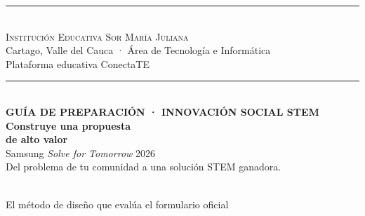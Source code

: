 \documentclass[11pt, letterpaper]{article}
\begin{document}
\begin{titlepage}
\thispagestyle{empty}
\begin{center}
  {\color{smjAzul}\rule{\linewidth}{2pt}}\\[0.25cm]
  {\large\sffamily\textsc{\color{smjAzul} Institución Educativa Sor María Juliana}}\\[0.1cm]
  {\normalsize\sffamily\color{smjVino} Cartago, Valle del Cauca \;·\; Área de Tecnología e Informática}\\[0.1cm]
  {\small\sffamily\color{smjDorado!80!black} Plataforma educativa ConectaTE}\\[0.25cm]
  {\color{smjDorado}\rule{\linewidth}{1pt}}\\[1.6cm]

  {\small\sffamily\color{sftAzul}\bfseries GUÍA DE PREPARACIÓN \;·\; INNOVACIÓN SOCIAL STEM}\\[0.5cm]
  {\Huge\sffamily\bfseries\color{smjAzul} Construye una propuesta\\[0.2cm] de \textcolor{valorVerde}{alto valor}}\\[0.7cm]
  {\large\sffamily\color{smjVino} Samsung \textit{Solve for Tomorrow} 2026}\\[0.3cm]
  {\normalsize\color{smjAzul!80} Del problema de tu comunidad a una solución STEM ganadora.}\\[1.4cm]

  \\[0.2cm]
  {\footnotesize\sffamily\color{gray} El método de diseño que evalúa el formulario oficial}\\[1.8cm]


\end{center}
\end{titlepage}
\end{document}
